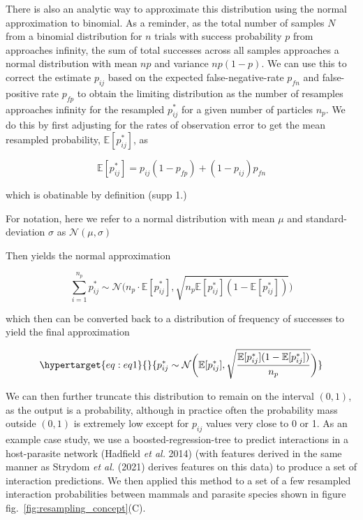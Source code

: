 \documentclass[11pt]{article}
\begin{document}
There is also an analytic way to approximate this distribution using the
normal approximation to binomial. As a reminder, as the total number of
samples \(N\) from a binomial distribution for \(n\) trials with success
probability \(p\) from approaches infinity, the sum of total successes
across all samples approaches a normal distribution with mean \(np\) and
variance \(np(1-p)\). We can use this to correct the estimate \(p_{ij}\)
based on the expected false-negative-rate \(p_{fn}\) and false-positive
rate \(p_{fp}\) to obtain the limiting distribution as the number of
resamples approaches infinity for the resampled \(p_{ij}^*\) for a given
number of particles \(n_p\). We do this by first adjusting for the rates
of observation error to get the mean resampled probability,
\(\mathbb{E}[{p_{ij}^*}]\), as

\[
\mathbb{E}[{p_{ij}^*}] = p_{ij}(1-p_{fp})+ (1-p_{ij})p_{fn}
\]

which is obatinable by definition (supp 1.)

For notation, here we refer to a normal distribution with mean \(\mu\)
and standard-deviation \(\sigma\) as \(\mathcal{N}(\mu,\sigma)\)

Then yields the normal approximation

\[
\sum_{i=1}^{n_p} p_{ij}^* \sim \mathcal{N}\bigg(n_p \cdot \mathbb{E}[p_{ij}^*], \sqrt{n_p\mathbb{E}[p_{ij}^*] (1- \mathbb{E}[p_{ij}^*])}\bigg)
\]

which then can be converted back to a distribution of frequency of
successes to yield the final approximation

\begin{equation}\protect\hypertarget{eq:eq1}{}{p_{ij}^* \sim \mathcal{N}\bigg( \mathbb{E}[p_{ij}^*] , \sqrt{\frac{\mathbb{E}[p_{ij}^*]
(1-\mathbb{E}[p_{ij}^*] )}{n_p}} \bigg)}\label{eq:eq1}\end{equation}

We can then further truncate this distribution to remain on the interval
\((0,1)\), as the output is a probability, although in practice often
the probability mass outside \((0,1)\) is extremely low except for
\(p_{ij}\) values very close to 0 or 1. As an example case study, we use
a boosted-regression-tree to predict interactions in a host-parasite
network (Hadfield \emph{et al.} 2014) (with features derived in the same
manner as Strydom \emph{et al.} (2021) derives features on this data) to
produce a set of interaction predictions. We then applied this method to
a set of a few resampled interaction probabilities between mammals and
parasite species shown in figure fig.~\ref{fig:resampling_concept}(C).
\end{document}
